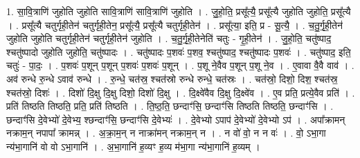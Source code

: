 \documentclass[17pt]{extarticle}
\begin{document}
1. सा॒वि॒त्राणि॑ जुहोति जुहोति सावि॒त्राणि॑ सावि॒त्राणि॑ जुहोति । . जु॒हो॒ति॒ प्रसू᳚त्यै॒ प्रसू᳚त्यै जुहोति जुहोति॒ प्रसू᳚त्यै । . प्रसू᳚त्यै चतुर्गृही॒तेन॑ चतुर्गृही॒तेन॒ प्रसू᳚त्यै॒ प्रसू᳚त्यै चतुर्गृही॒तेन॑ । . प्रसू᳚त्या॒ इति॒ प्र - सू॒त्यै॒ । . च॒तु॒र्गृ॒ही॒तेन॑ जुहोति जुहोति चतुर्गृही॒तेन॑ चतुर्गृही॒तेन॑ जुहोति । . च॒तु॒र्गृ॒ही॒तेनेति॑ चतुः - गृ॒ही॒तेन॑ । . जु॒हो॒ति॒ चतु॑ष्पाद॒ श्चतु॑ष्पादो जुहोति जुहोति॒ चतु॑ष्पादः । . चतु॑ष्पादः प॒शवः॑ प॒शव॒ श्चतु॑ष्पाद॒ श्चतु॑ष्पादः प॒शवः॑ । . चतु॑ष्पाद॒ इति॒ चतुः॑ - पा॒दः॒ । . प॒शवः॑ प॒शून् प॒शून् प॒शवः॑ प॒शवः॑ प॒शून् । . प॒शू ने॒वैव प॒शून् प॒शू ने॒व । . ए॒वावा वै॒वै वाव॑ । . अव॑ रुन्धे रु॒न्धे ऽवाव॑ रुन्धे । . रु॒न्धे॒ चत॑स्र॒ श्चत॑स्रो रुन्धे रुन्धे॒ चत॑स्रः । . चत॑स्रो॒ दिशो॒ दिश॒ श्चत॑स्र॒ श्चत॑स्रो॒ दिशः॑ । . दिशो॑ दि॒क्षु दि॒क्षु दिशो॒ दिशो॑ दि॒क्षु । . दि॒क्ष्वे॑वैव दि॒क्षु दि॒क्ष्वे॑व । . ए॒व प्रति॒ प्रत्ये॒वैव प्रति॑ । . प्रति॑ तिष्ठति तिष्ठति॒ प्रति॒ प्रति॑ तिष्ठति । . ति॒ष्ठ॒ति॒ छन्दाꣳ॑सि॒ छन्दाꣳ॑सि तिष्ठति तिष्ठति॒ छन्दाꣳ॑सि । . छन्दाꣳ॑सि दे॒वेभ्यो॑ दे॒वेभ्य॒ श्छन्दाꣳ॑सि॒ छन्दाꣳ॑सि दे॒वेभ्यः॑ । . दे॒वेभ्यो ऽपाप॑ दे॒वेभ्यो॑ दे॒वेभ्यो ऽप॑ । . अपा᳚क्रामन् नक्राम॒न् नपापा᳚ क्रामन्न् । . अ॒क्रा॒म॒न् न नाक्रा॑मन् नक्राम॒न् न । . न वो॑ वो॒ न न वः॑ । . वो॒ ऽभा॒गा न्य॑भा॒गानि॑ वो वो ऽभा॒गानि॑ । . अ॒भा॒गानि॑ ह॒व्यꣳ ह॒व्य म॑भा॒गा न्य॑भा॒गानि॑ ह॒व्यम् । \newline
\end{document}
